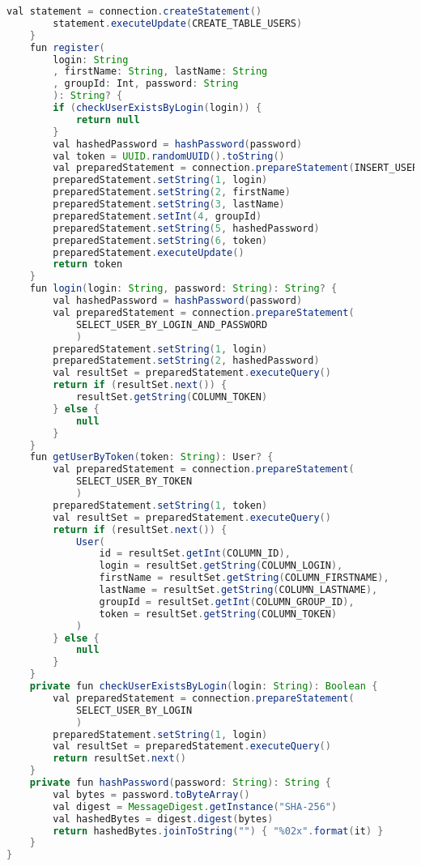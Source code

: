 \begin{lstlisting}[language=Java]
        val statement = connection.createStatement()
        statement.executeUpdate(CREATE_TABLE_USERS)
    }
    fun register(
		login: String
		, firstName: String, lastName: String
		, groupId: Int, password: String
		): String? {
        if (checkUserExistsByLogin(login)) {
            return null
        }
        val hashedPassword = hashPassword(password)
        val token = UUID.randomUUID().toString()
        val preparedStatement = connection.prepareStatement(INSERT_USER)
        preparedStatement.setString(1, login)
        preparedStatement.setString(2, firstName)
        preparedStatement.setString(3, lastName)
        preparedStatement.setInt(4, groupId)
        preparedStatement.setString(5, hashedPassword)
        preparedStatement.setString(6, token)
        preparedStatement.executeUpdate()
        return token
    }
    fun login(login: String, password: String): String? {
        val hashedPassword = hashPassword(password)
        val preparedStatement = connection.prepareStatement(
			SELECT_USER_BY_LOGIN_AND_PASSWORD
			)
        preparedStatement.setString(1, login)
        preparedStatement.setString(2, hashedPassword)
        val resultSet = preparedStatement.executeQuery()
        return if (resultSet.next()) {
            resultSet.getString(COLUMN_TOKEN)
        } else {
            null
        }
    }
    fun getUserByToken(token: String): User? {
        val preparedStatement = connection.prepareStatement(
			SELECT_USER_BY_TOKEN
			)
        preparedStatement.setString(1, token)
        val resultSet = preparedStatement.executeQuery()
        return if (resultSet.next()) {
            User(
                id = resultSet.getInt(COLUMN_ID),
                login = resultSet.getString(COLUMN_LOGIN),
                firstName = resultSet.getString(COLUMN_FIRSTNAME),
                lastName = resultSet.getString(COLUMN_LASTNAME),
                groupId = resultSet.getInt(COLUMN_GROUP_ID),
                token = resultSet.getString(COLUMN_TOKEN)
            )
        } else {
            null
        }
    }
    private fun checkUserExistsByLogin(login: String): Boolean {
        val preparedStatement = connection.prepareStatement(
			SELECT_USER_BY_LOGIN
			)
        preparedStatement.setString(1, login)
        val resultSet = preparedStatement.executeQuery()
        return resultSet.next()
    }
    private fun hashPassword(password: String): String {
        val bytes = password.toByteArray()
        val digest = MessageDigest.getInstance("SHA-256")
        val hashedBytes = digest.digest(bytes)
        return hashedBytes.joinToString("") { "%02x".format(it) }
    }
}
\end{lstlisting}

